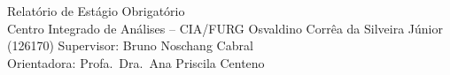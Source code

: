 \documentclass[12pt]{article}
\begin{document}
\capa
    {Relatório de Estágio Obrigatório\\[0.3cm]Centro Integrado de Análises -- CIA/FURG}
    {Osvaldino Corrêa da Silveira Júnior (126170)}
    {Supervisor: Bruno Noschang Cabral\\Orientadora: Profa.\ Dra.\ Ana Priscila Centeno}

\pagestyle{empty}
\renewcommand{\contentsname}{\hfill\bfseries SUMÁRIO\hfill}
\tableofcontents
\newpage
\pagestyle{fancy}
















\end{document}
